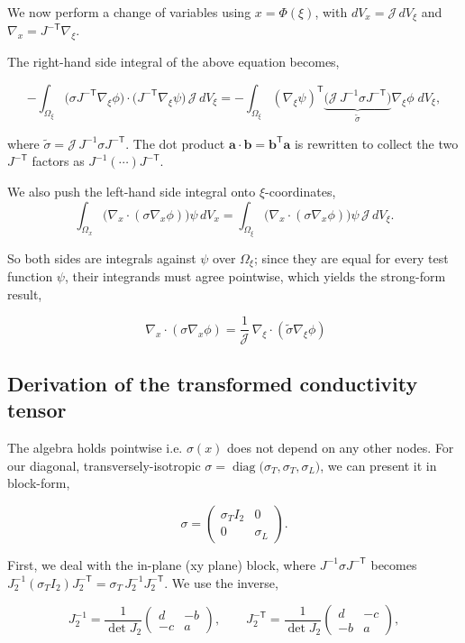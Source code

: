 \documentclass[final-report]{report-template}
\begin{document}
We now perform a change of variables using $x=\Phi(\xi)$, with $dV_x=\mathcal J\,dV_\xi$ and $\nabla_x=J^{-\mathsf T}\nabla_\xi$.

The right-hand side integral of the above equation becomes,

$$
-\int_{\Omega_\xi}\!\big(\sigma J^{-\mathsf T}\nabla_\xi\phi\big)\cdot\big(J^{-\mathsf T}\nabla_\xi\psi\big)\,\mathcal J\,dV_\xi
= -\int_{\Omega_\xi}\!(\nabla_\xi\psi)^{\mathsf T}\underbrace{\big(\mathcal J\,J^{-1}\sigma J^{-\mathsf T}\big)}_{\displaystyle \tilde\sigma}\nabla_\xi\phi\;dV_\xi ,
$$

where $\tilde\sigma=\mathcal J\,J^{-1}\sigma J^{-\mathsf T}$. The dot product $\mathbf a\cdot\mathbf b=\mathbf b^{\mathsf T}\mathbf a$ is rewritten to collect the two $J^{-\mathsf T}$ factors as $J^{-1}(\cdots)J^{-\mathsf T}$.

We also push the left-hand side integral onto $\xi$-coordinates, 
$$
\int_{\Omega_x}\!\big(\nabla_x\!\cdot(\sigma\nabla_x\phi)\big)\psi\,dV_x
= \int_{\Omega_\xi}\!\big(\nabla_x\!\cdot(\sigma\nabla_x\phi)\big)\psi\,\mathcal J\,dV_\xi .
$$

So both sides are integrals against $\psi$ over $\Omega_\xi$; since they are equal for every test function $\psi$, their integrands must agree pointwise, which yields the strong-form result,

$$
\;\nabla_x\!\cdot(\sigma\nabla_x\phi)=\frac{1}{\mathcal J}\,\nabla_\xi\!\cdot(\tilde\sigma\nabla_\xi\phi)
$$

\subsection{Derivation of the transformed conductivity tensor}
\label{sec:transformed-conductivity-derivation}

The algebra holds pointwise i.e. $\sigma(x)$ does not depend on any other nodes. For our diagonal, transversely-isotropic $\sigma=\operatorname{diag}\big(\sigma_T,\sigma_T,\sigma_L\big)$, we can present it in block-form,

$$
\sigma=\begin{pmatrix}\sigma_T I_2 & 0\\ 0 & \sigma_L\end{pmatrix}.
$$

First, we deal with the in-plane (xy plane) block, where $J^{-1}\sigma J^{-\mathsf T}$ becomes $J_2^{-1}(\sigma_T I_2)J_2^{-\mathsf T}=\sigma_T\,J_2^{-1}J_2^{-\mathsf T}$. We use the inverse,

$$
J_2^{-1}=\frac{1}{\det J_2}\begin{pmatrix} d&-b\\ -c&a\end{pmatrix},
\qquad
J_2^{-\mathsf T}=\frac{1}{\det J_2}\begin{pmatrix} d&-c\\ -b&a\end{pmatrix},
$$
\end{document}
